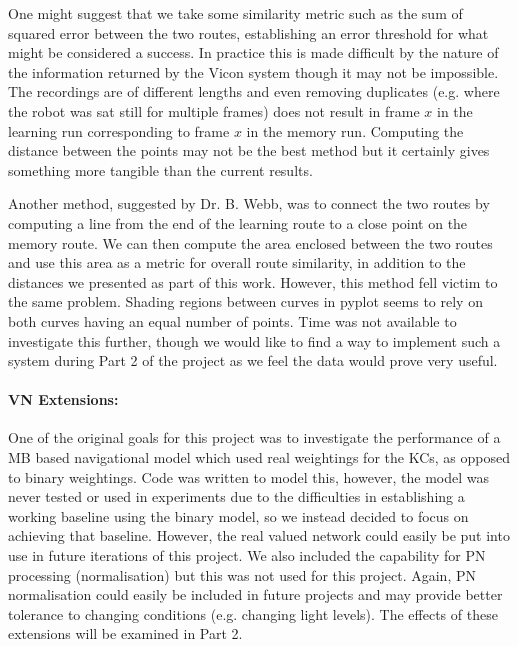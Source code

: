 \documentclass[a4paper,11pt,twoside,openright]{article}
\begin{document}
One might suggest that we take some similarity metric
such as the sum of squared error between the two routes, establishing an error threshold for what might be
considered a success. In practice this is made difficult by the nature of the information returned by the
Vicon system though it may not be impossible. The recordings are of different lengths and even removing
duplicates (e.g. where the robot was sat still for multiple frames) does not result in frame $x$ in the
learning run corresponding to frame $x$ in the memory run. Computing the distance between the points
may not be the best method but it certainly gives something more tangible than the current results.
\newline

Another method, suggested by Dr. B. Webb, was to connect the two routes by computing a line from the
end of the learning route to a close point on the memory route. We can then compute the area enclosed between
the two routes and use this area as a metric for overall route similarity, in addition to the distances we presented
as part of this work. However, this method fell victim to the same problem. Shading regions between curves
in pyplot seems to rely on both curves having an equal number of points. Time was not available to investigate
this further, though we would like to find a way to implement such a system
during Part 2 of the project as we feel the data would prove very useful.
\newline

\paragraph{VN Extensions:}
One of the original goals for this project was to investigate the performance of a MB based navigational
model which used real weightings for the KCs, as opposed to binary weightings. Code was written
to model this, however, the model was never tested or used in experiments due to the difficulties in
establishing a working baseline using the binary model, so we instead decided to focus on achieving that
baseline. However, the real valued network could easily be put into use in future iterations of this project.
We also included the capability for PN processing (normalisation) but this was not used for this project.
Again, PN normalisation could easily be included in future projects and may provide better tolerance to
changing conditions (e.g. changing light levels). The effects of these extensions will be examined
in Part 2.
\newline
\end{document}
